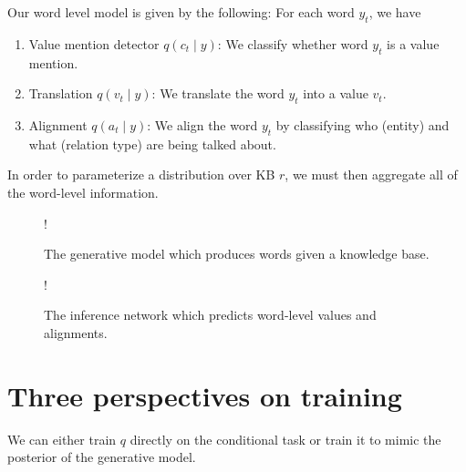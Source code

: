 \documentclass[12pt]{article}
\begin{document}
Our word level model is given by the following:
For each word $y_t$, we have
\begin{enumerate}
\item Value mention detector $q(c_t \mid y)$: We classify whether word $y_t$
   is a value mention. 
\item Translation $q(v_t \mid y)$: We translate the word $y_t$ into a value $v_t$.
\item Alignment $q(a_t \mid y)$: We align the word $y_t$ by classifying who (entity) and what (relation type)
are being talked about.
\end{enumerate}

In order to parameterize a distribution over KB $r$, we must then aggregate all of the word-level
information.

\begin{figure}[t]
\begin{center}
\resizebox {.3\columnwidth} {!} {
} %
\end{center}
\caption{The generative model which produces words given a knowledge base.}
\label{fig:genmodel}
\end{figure}

\begin{figure}[t]
\begin{center}
\resizebox {.3\columnwidth} {!} {
} %
\end{center}
\caption{The inference network which predicts word-level values and alignments.}
\label{fig:infmodel}
\end{figure}

\section{Three perspectives on training}
We can either train $q$ directly on the conditional task
or train it to mimic the posterior of the generative model.



\end{document}
